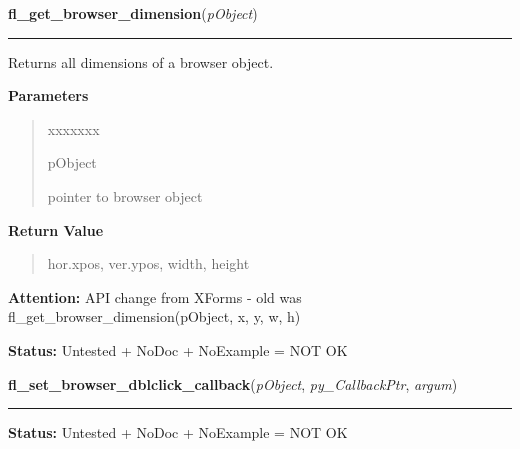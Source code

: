 \hspace{.8\funcindent}\begin{boxedminipage}{\funcwidth}

    \raggedright \textbf{fl\_get\_browser\_dimension}(\textit{pObject})

    \vspace{-1.5ex}

    \rule{\textwidth}{0.5\fboxrule}
\setlength{\parskip}{2ex}
    Returns all dimensions of a browser object.

\setlength{\parskip}{1ex}
      \textbf{Parameters}
      \vspace{-1ex}

      \begin{quote}
        \begin{Ventry}{xxxxxxx}

          \item[pObject]

          pointer to browser object

        \end{Ventry}

      \end{quote}

      \textbf{Return Value}
    \vspace{-1ex}

      \begin{quote}
      hor.xpos, ver.ypos, width, height

      \end{quote}

\textbf{Attention:} API change from XForms - old was fl\_get\_browser\_dimension(pObject, x, y,
w, h)



\textbf{Status:} Untested + NoDoc + NoExample = NOT OK



    \end{boxedminipage}

    \label{xformslib:library:fl_set_browser_dblclick_callback}

    \vspace{0.5ex}

\hspace{.8\funcindent}\begin{boxedminipage}{\funcwidth}

    \raggedright \textbf{fl\_set\_browser\_dblclick\_callback}(\textit{pObject}, \textit{py\_CallbackPtr}, \textit{argum})

    \vspace{-1.5ex}

    \rule{\textwidth}{0.5\fboxrule}
\setlength{\parskip}{2ex}
\setlength{\parskip}{1ex}
\textbf{Status:} Untested + NoDoc + NoExample = NOT OK



    \end{boxedminipage}


